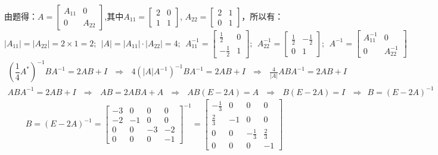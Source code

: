 \documentclass{article}
\begin{document}
\begin{jie}
由题得：$A=
\begin{bmatrix}
  A_{11} & 0 \\
  0 & A_{22}
\end{bmatrix}
$,其中$A_{11}=\begin{bmatrix}
              2 & 0 \\
              1 & 1
            \end{bmatrix}$,
$A_{22}=
\begin{bmatrix}
  2 & 1 \\
  0 & 1
\end{bmatrix}
$，所以有：
\begin{equation*}
|A_{11}|=|A_{22}|=2\times1=2;~~|A|=|A_{11}|\cdot|A_{22}|=4;~~A_{11}^{-1}=
\begin{bmatrix}
  \frac{1}{2} & 0 \\
  -\frac{1}{2} & 1
\end{bmatrix};~~A_{22}^{-1}=
\begin{bmatrix}
  \frac{1}{2} & -\frac{1}{2} \\
   0& 1
\end{bmatrix};~~A^{-1}=\begin{bmatrix}
  A_{11}^{-1} & 0 \\
  0 & A_{22}^{-1}
\end{bmatrix}
\end{equation*}
\begin{gather*}
\left(\dfrac{1}{4}A^{*}\right)^{-1}BA^{-1}=2AB+I ~~~\Rightarrow~~~
4(|A|A^{-1})^{-1}BA^{-1}=2AB+I ~~~ \Rightarrow~~~
\frac{4}{|A|}ABA^{-1}=2AB+I\\
ABA^{-1}=2AB+I~~~\Rightarrow~~~
AB=2ABA+A~~~\Rightarrow~~~
AB(E-2A)=A~~~\Rightarrow~~~
B(E-2A)=I~~~\Rightarrow~~
B=(E-2A)^{-1}
\end{gather*}
\begin{equation*}
  B=(E-2A)^{-1}=\begin{bmatrix}
  -3 & 0& 0 & 0 \\
  -2 & -1 & 0& 0 \\
  0 & 0 & -3& -2\\
   0& 0 &0 &-1
\end{bmatrix}^{-1}=
\begin{bmatrix}
  -\frac{1}{3} & 0& 0 & 0 \\
  \frac{2}{3} & -1 & 0& 0 \\
  0 & 0 & -\frac{1}{3}& \frac{2}{3}\\
   0& 0 &0 &-1
\end{bmatrix}
\end{equation*}
\end{jie}
\end{document}
